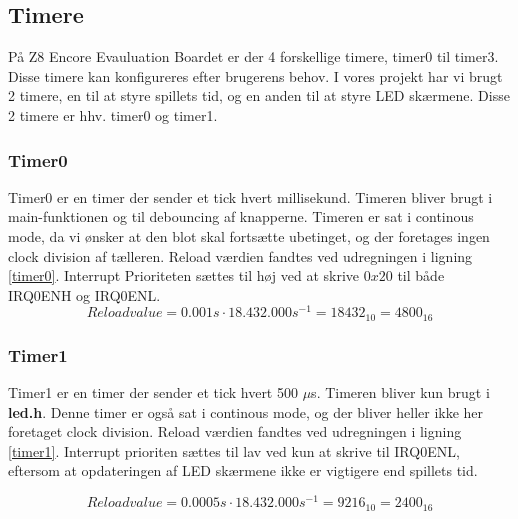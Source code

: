 \subsection{Timere}
På Z8 Encore Evauluation Boardet er der 4 forskellige timere, timer0 til timer3. Disse timere kan konfigureres efter brugerens behov. I vores projekt har vi brugt 2 timere, en til at styre spillets tid, og en anden til at styre LED skærmene. Disse 2 timere er hhv. timer0 og timer1.
\subsubsection{Timer0}
Timer0 er en timer der sender et tick hvert millisekund. Timeren bliver brugt i main-funktionen og til debouncing af knapperne. Timeren er sat i continous mode, da vi ønsker at den blot skal fortsætte ubetinget, og der foretages ingen clock division af tælleren. Reload værdien fandtes ved udregningen i ligning \ref{timer0}. Interrupt Prioriteten sættes til høj ved at skrive $0x20$ til både IRQ0ENH og IRQ0ENL.
\begin{equation}
\label{timer0}
Reloadvalue = 0.001 \si{s} \cdot 18.432.000 \si{s^{-1}} = 18432_{10} = 4800_{16} 
\end{equation}
\subsubsection{Timer1}
Timer1 er en timer der sender et tick hvert 500 $\mu$s. Timeren bliver kun brugt i \textbf{led.h}. Denne timer er også sat i continous mode, og der bliver heller ikke her foretaget clock division. Reload værdien fandtes ved udregningen i ligning \ref{timer1}. Interrupt prioriten sættes til lav ved kun at skrive til IRQ0ENL, eftersom at opdateringen af LED skærmene ikke er vigtigere end spillets tid.

\begin{equation}
\label{timer1}
Reloadvalue  = 0.0005 \si{s} \cdot 18.432.000 \si{s^{-1}} = 9216_{10} =  2400_{16}  
\end{equation}

